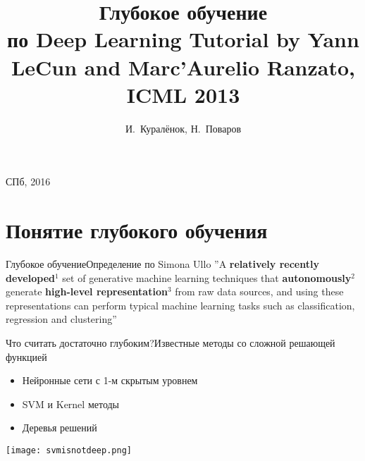 \documentclass[14pt, fleqn, xcolor={dvipsnames, table}]{beamer}
\title{Глубокое обучение\\\small{по Deep Learning Tutorial by Yann LeCun and Marc'Aurelio Ranzato, ICML 2013}}
\author[]{\small{%
И.~Куралёнок,
Н.~Поваров}}
\date{}
\begin{document}
\begin{frame}
\maketitle
\small
\begin{center}
\vspace{-60pt}
\vspace{80pt}
\footnotesize СПб, 2016
\end{center}
\end{frame}
\section{Понятие глубокого обучения} %

\begin{frame}{Глубокое обучение}{Определение по Simona Ullo}
\small
''A \textbf{relatively recently developed}$^1$ set of generative machine learning techniques that \textbf{autonomously}$^2$ generate \textbf{high-level representation}$^3$ from raw data sources, and using these representations can perform typical machine learning tasks such as classification, regression and clustering''\\ 
\begin{enumerate}
\end{enumerate}
\end{frame}
 
\begin{frame}{Что считать достаточно глубоким?}{Известные методы со сложной решающей функцией}
\begin{minipage}{0.45\textwidth}\small
\begin{itemize}
  \item Нейронные сети с 1-м скрытым уровнем
  \item SVM и Kernel методы
  \item Деревья решений
\end{itemize}
\end{minipage}
\hfill
\begin{minipage}{0.45\textwidth}
\texttt{[image: svmisnotdeep.png]}
\end{minipage}
\end{frame}
\end{document}
